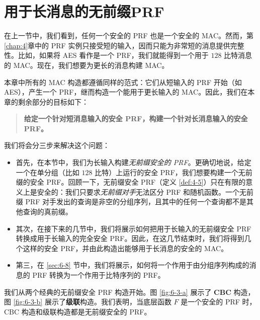 \section{用于长消息的无前缀PRF}\label{sec:6-4}

在上一节中，我们看到，任何一个安全的 PRF 也是一个安全的 MAC。然而，第\ref{chap:4}章中的 PRF 实例只接受短的输入，因而只能为非常短的消息提供完整性。比如，如果将 AES 看作是一个 PRF，我们就能得到一个用于 $128$ 比特消息的 MAC。现在，我们想要为更长的消息构建 MAC。

本章中所有的 MAC 构造都遵循同样的范式：它们从短输入的 PRF 开始（如 AES），产生一个 PRF，继而构造一个能用于更长输入的 MAC。因此，我们在本章的剩余部分的目标如下：
\begin{quote}
\textbf{给定一个针对短消息输入的安全 PRF，构建一个针对长消息输入的安全 PRF。}
\end{quote}
我们将会分三步来解决这个问题：
\begin{itemize}
	\item 首先，在本节中，我们为长输入构建\emph{无前缀安全的 PRF}。更确切地说，给定一个在单分组（比如 $128$ 比特）上运行的安全 PRF，我们想要构建一个无前缀的安全 PRF。回顾一下，无前缀安全 PRF（定义 \ref{def:4-5}）只在有限的意义上是安全的：我们只要求\emph{无前缀对手}无法区分 PRF 和随机函数。一个无前缀 PRF 对手发出的查询是非空的分组序列，且其中的任何一个查询都不是其他查询的真前缀。
	\item 其次，在接下来的几节中，我们将展示如何把用于长输入的无前缀安全 PRF 转换成用于长输入的完全安全 PRF。因此，在这几节结束时，我们将得到几个这样的安全 PRF，并由此构造出能够用于长消息的安全的 MAC。
	\item 第三，在 \ref{sec:6-8} 节中，我们将展示，如何将一个作用于由分组序列构成的消息的 PRF 转换为一个作用于比特序列的 PRF。
\end{itemize}

\begin{snote}
我们从两个经典的无前缀安全 PRF 构造开始。图 \ref{fig:6-3-a} 展示了 \textbf{CBC} 构造，图 \ref{fig:6-3-b} 展示了\textbf{级联}构造。我们表明，当底层函数 $F$ 是一个安全的 PRF 时，CBC 构造和级联构造都是无前缀安全的 PRF。
\end{snote}

